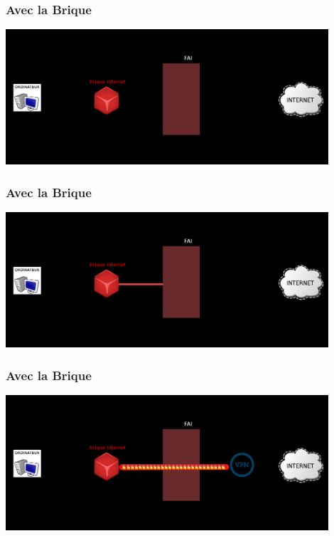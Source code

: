 \documentclass[notes=hide]{beamer}
\begin{document}
\begin{frame}[t]
\frametitle{\textcolor{titre}{Avec la Brique}}
		  \color{red!60} %
		  \begin{center}
		  \includegraphics[width=0.9\textwidth]{img2/connexion11.png}
		  \end{center}
\end{frame}
\begin{frame}[t]
\frametitle{\textcolor{titre}{Avec la Brique}}
		  \begin{center}
		  \includegraphics[width=0.9\textwidth]{img2/connexion12.png}
		  \end{center}
\end{frame}
\begin{frame}[t]
\frametitle{\textcolor{titre}{Avec la Brique}}
		  \begin{center}
		  \includegraphics[width=0.9\textwidth]{img2/connexion13.png}
		  \end{center}
\end{frame}
\end{document}

